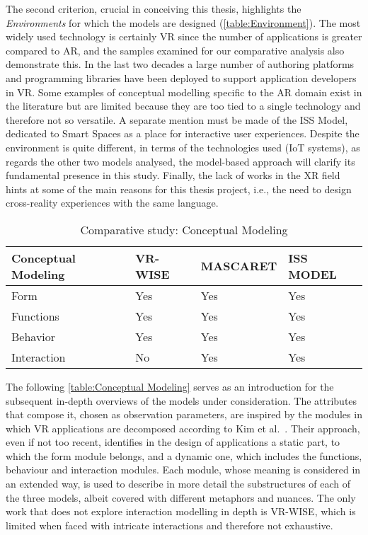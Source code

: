 The second criterion, crucial in conceiving this thesis, highlights the \textit{Environments} for which the models are designed (\autoref{table:Environment}). The most widely used technology is certainly VR since the number of applications is greater compared to AR, and the samples examined for our comparative analysis also demonstrate this. 
In the last two decades a large number of authoring platforms and programming libraries have been deployed to support application developers in VR. Some examples of conceptual modelling specific to the AR domain exist in the literature but are limited because they are too tied to a single technology and therefore not so versatile. A separate mention must be made of the ISS Model, dedicated to Smart Spaces as a place for interactive user experiences. Despite the environment is quite different, in terms of the technologies used (IoT systems), as regards the other two models analysed, the model-based approach will clarify its fundamental presence in this study. 
Finally, the lack of works in the XR field hints at some of the main reasons for this thesis project, i.e., the need to design cross-reality experiences with the same language.

\begin{table}
\begin{tabular}{|p{2.5cm}|p{3cm}|p{3cm}|p{3cm}|} 
\hline %
\textbf{Conceptual Modeling} 
& \textbf{VR-WISE} 
& \textbf{MASCARET}
& \textbf{ISS MODEL} \\ 
\hline
Form
& Yes
& Yes
& Yes\\ 
\hline
Functions
& Yes
& Yes
& Yes\\ 
\hline
Behavior
& Yes
& Yes
& Yes\\ 
\hline
Interaction
& No
& Yes
& Yes\\ 
\hline
\end{tabular} 
\caption{Comparative study: Conceptual Modeling}
\label{table:Conceptual Modeling}
\end{table}

The following \autoref{table:Conceptual Modeling} serves as an introduction for the subsequent in-depth overviews of the models under consideration. The attributes that compose it, chosen as observation parameters, are inspired by the modules in which VR applications are decomposed according to Kim et al.~\cite{kim_software_1998}. Their approach, even if not too recent, identifies in the design of applications a static part, to which the form module belongs, and a dynamic one, which includes the functions, behaviour and interaction modules. Each module, whose meaning is considered in an extended way, is used to describe in more detail the substructures of each of the three models, albeit covered with different metaphors and nuances. The only work that does not explore interaction modelling in depth is VR-WISE, which is limited when faced with intricate interactions and therefore not exhaustive. 

